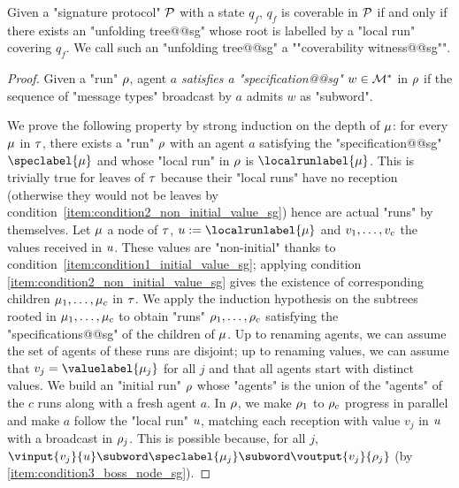 \begin{lemma}
\label{lem:coverability_witness_sg}
Given a "signature protocol" $\mathcal{P}$ with a state $q_f$, $q_f$ is coverable in $\mathcal{P}$ if and only if there exists an "unfolding tree@@sg" whose root is labelled by a "local run" covering $q_f$. We call such an "unfolding tree@@sg" a ""coverability witness@@sg"".
\end{lemma}
\begin{proof}
Given a "run" $\rho$, agent $a$ \emph{satisfies a "specification@@sg"} $w \in \mathcal{M}^*$ in $\rho$ if the sequence of "message types" broadcast by $a$ admits $w$ as "subword".%

We prove the following property by strong induction on the depth of $\mu$: for every $\mu$ in $\tau$, there exists a "run" $\rho$ with an agent $a$ satisfying the "specification@@sg" $\speclabel{\node}$ and whose "local run" in $\rho$ is $\localrunlabel{\node}$. This is trivially true for leaves of $\tau$ because their "local runs" have no reception (otherwise they would not be leaves by condition~\ref{item:condition2_non_initial_value_sg}) hence are actual "runs" by themselves. 
Let $\mu$ a node of $\tau$, $\localrun := \localrunlabel{\node}$ and $v_1, \dots, v_c$ the values received in $u$. 
These values are "non-initial" thanks to condition~\ref{item:condition1_initial_value_sg}; applying condition \ref{item:condition2_non_initial_value_sg} gives the existence of corresponding children $\mu_1, \dots, \mu_c$ in $\tau$. 
We apply the induction hypothesis on the subtrees rooted in $\mu_1, \dots, \mu_c$ to obtain "runs" $\rho_1, \dots, \rho_c$ satisfying the "specifications@@sg" of the children of $\mu$. 
Up to renaming agents, we can assume the set of agents of these runs are disjoint; up to renaming values, we can assume that $\aval_j = \valuelabel{\node_j}$ for all $j$ and that all agents start with distinct values. 
We build an "initial run" $\rho$ whose "agents" is the union of the "agents" of the $c$ runs along with a fresh agent $a$. In $\rho$, we make $\rho_1$ to $\rho_c$ progress in parallel and make $a$ follow the "local run" $u$, matching each reception with value $v_j$ in $u$ with a broadcast in $\rho_j$. 
This is possible because, for all $j$, $\vinput{v_j}{\localrun} \subword \speclabel{\node_j} \subword \voutput{v_j}{\run_j}$ (by \ref{item:condition3_boss_node_sg}). 


\end{proof}
